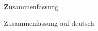 
\begin{center}
{\Large \textbf Zusammenfassung}
\end{center}
\vspace{1cm}

Zusammenfassung auf deutsch